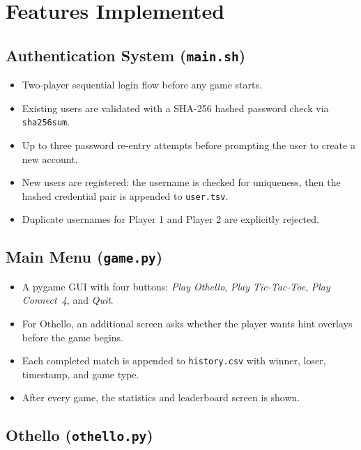 \documentclass[12pt]{article}
\begin{document}
\section{Features Implemented}
 
\subsection{Authentication System (\texttt{main.sh})}
 
\begin{itemize}
    \item Two-player sequential login flow before any game starts.
    \item Existing users are validated with a SHA-256 hashed password check via \texttt{sha256sum}.
    \item Up to three password re-entry attempts before prompting the user to create a new account.
    \item New users are registered: the username is checked for uniqueness, then the hashed credential pair is appended to \texttt{user.tsv}.
    \item Duplicate usernames for Player 1 and Player 2 are explicitly rejected.
\end{itemize}
 
\subsection{Main Menu (\texttt{game.py})}
 
\begin{itemize}
    \item A pygame GUI with four buttons: \textit{Play Othello}, \textit{Play Tic-Tac-Toe}, \textit{Play Connect~4}, and \textit{Quit}.
    \item For Othello, an additional screen asks whether the player wants hint overlays before the game begins.
    \item Each completed match is appended to \texttt{history.csv} with winner, loser, timestamp, and game type.
    \item After every game, the statistics and leaderboard screen is shown.
\end{itemize}
 
\subsection{Othello (\texttt{othello.py})}
 
\end{document}
